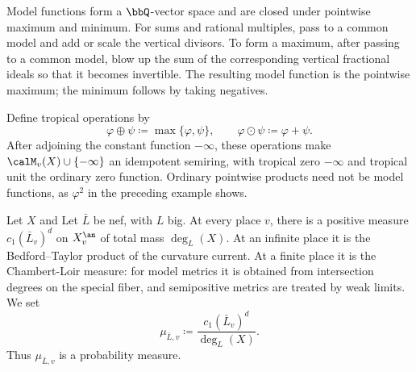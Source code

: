 \begin{remark}[label=\labelNFM{rmk:tropical-semiring-and-model-function}, status=draft, tag=0000000]
	\begin{latexmathchange}
		Model functions form a $\bbQ$-vector space and are closed under pointwise maximum and minimum.
		For sums and rational multiples, pass to a common model and add or scale the vertical divisors.
		To form a maximum, after passing to a common model, blow up the sum of the corresponding vertical fractional ideals so that it becomes invertible.
		The resulting model function is the pointwise maximum; the minimum follows by taking negatives.

		Define tropical operations by
		\[ \varphi \oplus \psi \coloneqq \max\{\varphi,\psi\}, \qquad \varphi \odot \psi \coloneqq \varphi + \psi. \]
		After adjoining the constant function $-\infty$, these operations make $\calM_v(X) \cup \{-\infty\}$ an idempotent semiring,
		with tropical zero $-\infty$ and tropical unit the ordinary zero function.
		Ordinary pointwise products need not be model functions, as $\varphi^2$ in the preceding example shows.
	\end{latexmathchange}
\end{remark}


\begin{definition}[label=\labelNFM{def:Chambert-Loir-measure}, status=draft, tag=0000000]
	Let $X$ and
	Let $\bar L$ be nef, with $L$ big.
	At every place $v$, there is a positive measure $c_1(\bar L_v)^d$ on $X_v^\an$ of total mass $\deg_L(X)$.
	At an infinite place it is the Bedford--Taylor product of the curvature current.
	At a finite place it is the Chambert-Loir measure: for model metrics it is obtained from intersection degrees on the special fiber, and semipositive metrics are treated by weak limits.
	We set
	\[ \mu_{\bar L,v} \coloneqq \frac{c_1(\bar L_v)^d}{\deg_L(X)}. \]
	Thus $\mu_{\bar L,v}$ is a probability measure.
	\Yang{}
\end{definition}




























